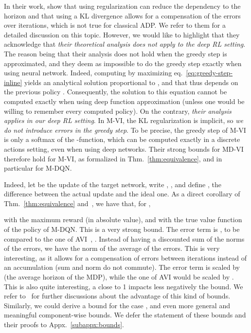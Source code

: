 \documentclass{article}
\begin{document}
In their work, \citet{vieillard2020leverage} show that using regularization can reduce the dependency to the horizon  and that using a KL divergence allows for a compensation of the errors  over iterations, which is not true for classical ADP. We refer to them for a detailed discussion on this topic. However, we would like to highlight that they acknowledge that \emph{their theoretical analysis does not apply to the deep RL setting}. The reason being that their analysis does not hold when the greedy step is approximated, and they deem as impossible to do the greedy step exactly when using neural network.
Indeed, computing  by maximizing eq.~\eqref{eq:greedy-step-inline} yields an analytical solution proportional to , and that thus depends on the previous policy . Consequently, the solution to this equation cannot be computed exactly when using deep function approximation (unless one would be willing to remember every computed policy). On the contrary, 
\emph{their analysis applies in our deep RL setting}. In M-VI, the KL regularization is implicit, so \emph{we do not introduce errors in the greedy step}. To be precise, the greedy step of M-VI is only a softmax of the -function, which can be computed exactly in a discrete actions setting, even when using deep networks. Their strong bounds for MD-VI therefore hold for M-VI, as formalized in Thm.~\ref{thm:equivalence}, and in particular for M-DQN.

Indeed, let  be the  update of the target network, write , , and define , the difference between the actual update and the ideal one. As a direct corollary of Thm.~\ref{thm:equivalence} and~\cite[Thm.~1]{vieillard2020leverage}, we have that, for ,

with  the maximum reward (in absolute value), and with  the true value function of the policy of M-DQN. This is a very strong bound. The error term is , to be compared to the one of AVI~\cite{scherrer2015approximate}, . Instead of having a discounted sum of the norms of the errors, we have the norm of the average of the errors. This is very interesting, as it allows for a compensation of errors between iterations instead of an accumulation (sum and norm do not commute). The error term is scaled by  (the average horizon of the MDP), while the one of AVI would be scaled by . This is also quite interesting, a  close to 1 impacts less negatively the bound. We refer to~\cite[Sec.~4.1]{vieillard2020leverage} for further discussions about the advantage of this kind of bounds. Similarly, we could derive a bound for the case , and even more general and meaningful component-wise bounds. We defer the statement of these bounds and their proofs to Appx.~\ref{subappx:bounds}.
\end{document}
